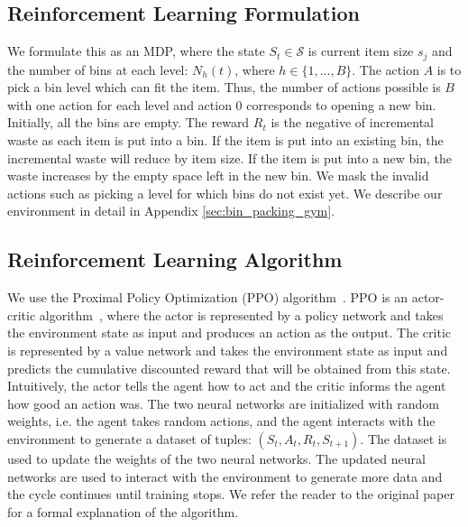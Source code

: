 \subsection{Reinforcement Learning Formulation}
We formulate this as an MDP, where the state $S_t \in \mathcal{S}$ is current item size $s_j$ and the number of bins at each level: $N_h(t)$, where $h \in \{1,...,B\}$. The action $A$ is to pick a bin level which can fit the item.  Thus, the number of actions possible is $B$ with one action for each level and action 0 corresponds to opening a new bin. Initially, all the bins are empty. The reward $R_t$ is the negative of incremental waste as each item is put into a bin. If the item is put into an existing bin, the incremental waste will reduce by item size. If the item is put into a new bin, the waste increases by the empty space left in the new bin. We mask the invalid actions such as picking a level for which bins do not exist yet. We describe our environment in detail in Appendix \ref{sec:bin_packing_gym}.

\subsection{Reinforcement Learning Algorithm}
We use the Proximal Policy Optimization (PPO) algorithm~\cite{schulman2017proximal}. PPO is an actor-critic algorithm~\cite{konda2000actor}, where the actor is represented by a policy network and takes the environment state as input and produces an action as the output. The critic is represented by a value network and takes the environment state as input and predicts the cumulative discounted reward that will be obtained from this state. Intuitively, the actor tells the agent how to act and the critic informs the agent how good an action was. The two neural networks are initialized with random weights, i.e. the agent takes random actions, and the agent interacts with the environment to generate a dataset of tuples: $(S_t, A_t, R_t, S_{t+1})$. The dataset is used to update the weights of the two neural networks. The updated neural networks are used to interact with the environment to generate more data and the cycle continues until training stops. We refer the reader to the original paper~\cite{schulman2017proximal} for a formal explanation of the algorithm.


